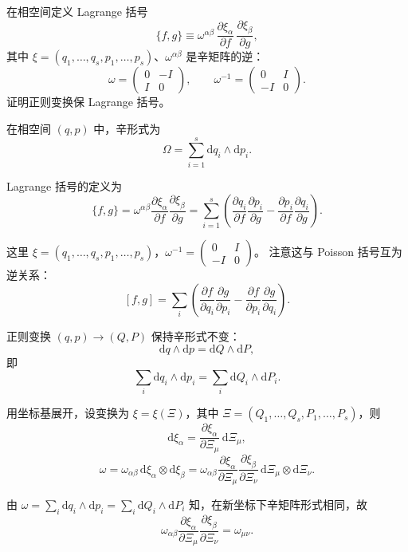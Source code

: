 \begin{question}
在相空间定义 Lagrange 括号
\[
\{f,g\} \equiv \omega^{\alpha\beta}\,\frac{\partial\xi_\alpha}{\partial f}
\,\frac{\partial\xi_\beta}{\partial g},
\]
其中 \(\xi = (q_1,\dots,q_s,p_1,\dots,p_s)\)、\(\omega^{\alpha\beta}\) 是辛矩阵的逆：
\[
\omega = \begin{pmatrix} 0 & -I \\ I & 0 \end{pmatrix},\qquad
\omega^{-1} = \begin{pmatrix} 0 & I \\ -I & 0 \end{pmatrix}.
\]
证明正则变换保 Lagrange 括号。
\begin{solution}
在相空间 \((q,p)\) 中，辛形式为
\[
\Omega = \sum_{i=1}^s \mathrm dq_i\wedge\mathrm dp_i.
\]

Lagrange 括号的定义为
\[
\{f,g\} = \omega^{\alpha\beta}\frac{\partial\xi_\alpha}{\partial f}
\frac{\partial\xi_\beta}{\partial g}
= \sum_{i=1}^s\left(
\frac{\partial q_i}{\partial f}\frac{\partial p_i}{\partial g}
- \frac{\partial p_i}{\partial f}\frac{\partial q_i}{\partial g}
\right).
\]

这里 \(\xi = (q_1,\dots,q_s,p_1,\dots,p_s)\)，\(\omega^{-1} = \begin{pmatrix}0&I\\-I&0\end{pmatrix}\)。
注意这与 Poisson 括号互为逆关系：
\[
[f,g] = \sum_i\left(
\frac{\partial f}{\partial q_i}\frac{\partial g}{\partial p_i}
- \frac{\partial f}{\partial p_i}\frac{\partial g}{\partial q_i}
\right).
\]

正则变换 \((q,p)\to(Q,P)\) 保持辛形式不变：
\[
\mathrm dq\wedge\mathrm dp = \mathrm dQ\wedge\mathrm dP,
\]
即
\[
\sum_i \mathrm dq_i\wedge\mathrm dp_i = \sum_i \mathrm dQ_i\wedge\mathrm dP_i.
\]

用坐标基展开，设变换为 \(\xi = \xi(\Xi)\)，其中 \(\Xi = (Q_1,\dots,Q_s,P_1,\dots,P_s)\)，则
\[
\mathrm d\xi_\alpha = \frac{\partial\xi_\alpha}{\partial\Xi_\mu}\,\mathrm d\Xi_\mu,
\]
\[
\omega = \omega_{\alpha\beta}\,\mathrm d\xi_\alpha\otimes\mathrm d\xi_\beta
= \omega_{\alpha\beta}\frac{\partial\xi_\alpha}{\partial\Xi_\mu}
\frac{\partial\xi_\beta}{\partial\Xi_\nu}\,\mathrm d\Xi_\mu\otimes\mathrm d\Xi_\nu.
\]

由 \(\omega = \sum_i\mathrm dq_i\wedge\mathrm dp_i = \sum_i\mathrm dQ_i\wedge\mathrm dP_i\) 知，在新坐标下辛矩阵形式相同，故
\[
\omega_{\alpha\beta}\frac{\partial\xi_\alpha}{\partial\Xi_\mu}
\frac{\partial\xi_\beta}{\partial\Xi_\nu} = \omega_{\mu\nu}.
\]


\end{solution}
\end{question}
